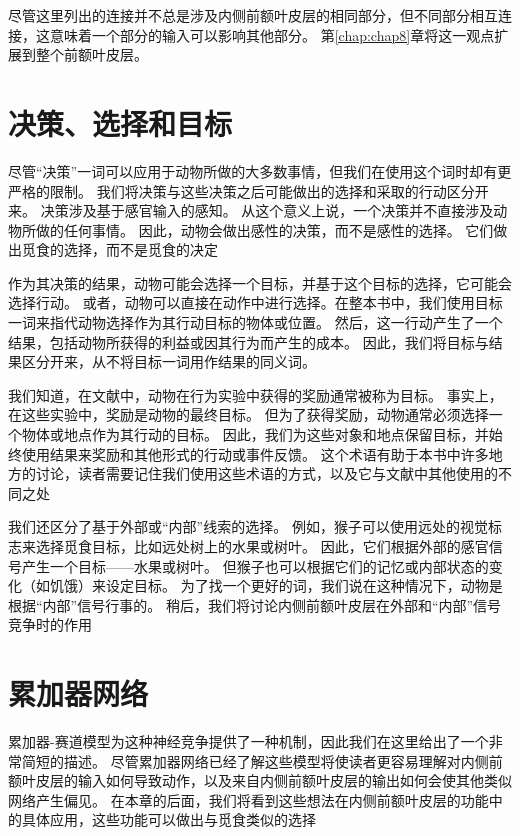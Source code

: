 尽管这里列出的连接并不总是涉及内侧前额叶皮层的相同部分，但不同部分相互连接\cite{barbas2000connections}，这意味着一个部分的输入可以影响其他部分。
第\ref{chap:chap8}章将这一观点扩展到整个前额叶皮层。\par



\section{决策、选择和目标}

尽管“决策”一词可以应用于动物所做的大多数事情，但我们在使用这个词时却有更严格的限制。
我们将决策与这些决策之后可能做出的选择和采取的行动区分开来\cite{schall2001neural}。
决策涉及基于感官输入的感知。
从这个意义上说，一个决策并不直接涉及动物所做的任何事情。
因此，动物会做出感性的决策，而不是感性的选择。
它们做出觅食的选择，而不是觅食的决定\par


作为其决策的结果，动物可能会选择一个目标，并基于这个目标的选择，它可能会选择行动。
或者，动物可以直接在动作中进行选择。在整本书中，我们使用目标一词来指代动物选择作为其行动目标的物体或位置。
然后，这一行动产生了一个结果，包括动物所获得的利益或因其行为而产生的成本。
因此，我们将目标与结果区分开来，从不将目标一词用作结果的同义词。\par


我们知道，在文献中，动物在行为实验中获得的奖励通常被称为目标。
事实上，在这些实验中，奖励是动物的最终目标。
但为了获得奖励，动物通常必须选择一个物体或地点作为其行动的目标。
因此，我们为这些对象和地点保留目标，并始终使用结果来奖励和其他形式的行动或事件反馈。
这个术语有助于本书中许多地方的讨论，读者需要记住我们使用这些术语的方式，以及它与文献中其他使用的不同之处\par


我们还区分了基于外部或“内部”线索的选择\cite{Passingham et al.2010}。
例如，猴子可以使用远处的视觉标志来选择觅食目标，比如远处树上的水果或树叶。
因此，它们根据外部的感官信号产生一个目标——水果或树叶。
但猴子也可以根据它们的记忆或内部状态的变化（如饥饿）来设定目标。
为了找一个更好的词，我们说在这种情况下，动物是根据“内部”信号行事的。
稍后，我们将讨论内侧前额叶皮层在外部和“内部”信号竞争时的作用\par



\section{累加器网络}

累加器-赛道模型为这种神经竞争提供了一种机制，因此我们在这里给出了一个非常简短的描述。
尽管累加器网络已经了解这些模型将使读者更容易理解对内侧前额叶皮层的输入如何导致动作，以及来自内侧前额叶皮层的输出如何会使其他类似网络产生偏见。
在本章的后面，我们将看到这些想法在内侧前额叶皮层的功能中的具体应用，这些功能可以做出与觅食类似的选择\par


